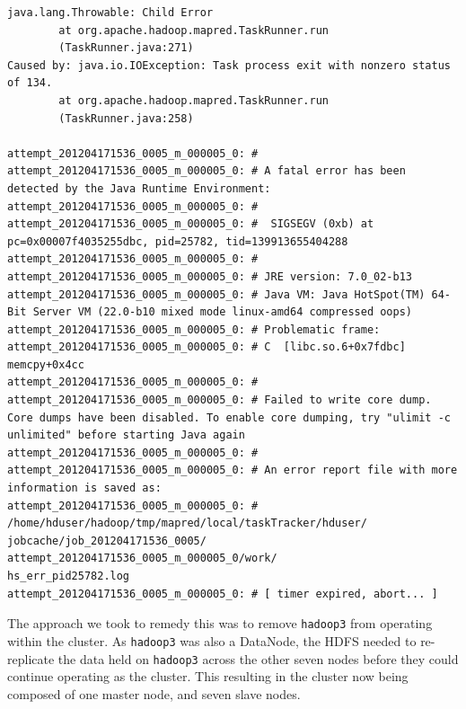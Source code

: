\begin{lstlisting}[float]
java.lang.Throwable: Child Error
        at org.apache.hadoop.mapred.TaskRunner.run
        (TaskRunner.java:271)
Caused by: java.io.IOException: Task process exit with nonzero status of 134.
        at org.apache.hadoop.mapred.TaskRunner.run
        (TaskRunner.java:258)

attempt_201204171536_0005_m_000005_0: #
attempt_201204171536_0005_m_000005_0: # A fatal error has been detected by the Java Runtime Environment:
attempt_201204171536_0005_m_000005_0: #
attempt_201204171536_0005_m_000005_0: #  SIGSEGV (0xb) at pc=0x00007f4035255dbc, pid=25782, tid=139913655404288
attempt_201204171536_0005_m_000005_0: #
attempt_201204171536_0005_m_000005_0: # JRE version: 7.0_02-b13
attempt_201204171536_0005_m_000005_0: # Java VM: Java HotSpot(TM) 64-Bit Server VM (22.0-b10 mixed mode linux-amd64 compressed oops)
attempt_201204171536_0005_m_000005_0: # Problematic frame:
attempt_201204171536_0005_m_000005_0: # C  [libc.so.6+0x7fdbc]  memcpy+0x4cc
attempt_201204171536_0005_m_000005_0: #
attempt_201204171536_0005_m_000005_0: # Failed to write core dump. Core dumps have been disabled. To enable core dumping, try "ulimit -c unlimited" before starting Java again
attempt_201204171536_0005_m_000005_0: #
attempt_201204171536_0005_m_000005_0: # An error report file with more information is saved as:
attempt_201204171536_0005_m_000005_0: # /home/hduser/hadoop/tmp/mapred/local/taskTracker/hduser/
jobcache/job_201204171536_0005/
attempt_201204171536_0005_m_000005_0/work/
hs_err_pid25782.log
attempt_201204171536_0005_m_000005_0: # [ timer expired, abort... ]
\end{lstlisting}

The approach we took to remedy this was to remove {\tt hadoop3} from operating within the cluster. As {\tt hadoop3} was also a DataNode, the HDFS needed to re-replicate the data held on {\tt hadoop3} across the other seven nodes before they could continue operating as the cluster. This resulting in the cluster now being composed of one master node, and seven slave nodes.